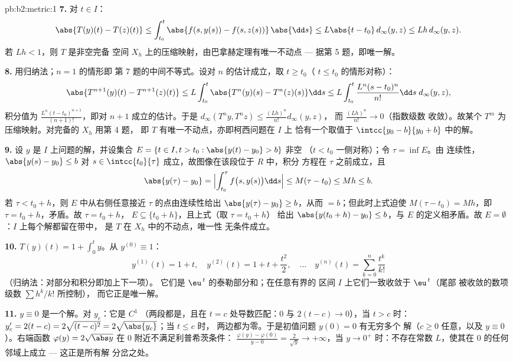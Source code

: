 \begin{solution}{pb:b2:metric:1}
\textbf{7.} 对 $t \in I$：
\[
\abs{T(y)(t) - T(z)(t)} \leq \int_{t_0}^{t}\abs{f(s, y(s)) -
f(s, z(s))}\,\abs{\dd s} \leq L\abs{t - t_0}\,d_\infty(y,z)
\leq Lh\,d_\infty(y,z).
\]
若 $Lh < 1$，则 $T$ 是非空完备
空间 $X_h$ 上的压缩映射，由巴拿赫定理有唯一不动点 ---
据第 5 题，即唯一解。

\textbf{8.} 用归纳法；$n = 1$ 的情形即
第 7 题的中间不等式。设对 $n$ 的估计成立，取 $t \geq t_0$（
$t \leq t_0$ 的情形对称）：
\[
\abs{T^{n+1}(y)(t) - T^{n+1}(z)(t)}
\leq L\int_{t_0}^{t}\abs{T^n(y)(s) - T^n(z)(s)}\dd s
\leq L\int_{t_0}^{t}\frac{L^n(s - t_0)^n}{n!}\dd s\;
d_\infty(y,z),
\]
积分值为 $\frac{L^n(t -
t_0)^{n+1}}{(n+1)!}$，即对 $n + 1$ 成立的估计。于是
$d_\infty(T^n y, T^n z) \leq \frac{(Lh)^n}{n!}d_\infty(y, z)$，
而 $\frac{(Lh)^n}{n!} \to 0$（指数级数
收敛）。故某个 $T^m$ 为压缩映射。对完备的 $X_h$ 用第 4 题，
即 $T$ 有唯一不动点，亦即柯西问题在 $I$ 上
恰有一个取值于
$\intcc{y_0 - b}{y_0 + b}$ 中的解。

\textbf{9.} 设 $y$ 是 $I$ 上问题的解，并设集合
$E = \{t \in I, t > t_0 : \abs{y(t) - y_0} > b\}$ 非空
（$t < t_0$ 一侧对称）；令 $\tau = \inf E$。由
连续性，$\abs{y(s) - y_0} \leq b$ 对 $s \in
\intcc{t_0}{\tau}$ 成立，故图像在该段位于 $R$ 中，积分
方程在 $\tau$ 之前成立，且
\[
\abs{y(\tau) - y_0} = \Bigl|\int_{t_0}^{\tau}f\bigl(s,
y(s)\bigr)\dd s\Bigr| \leq M(\tau - t_0) \leq Mh \leq b .
\]
若 $\tau < t_0 + h$，则 $E$ 中从右侧任意接近 $\tau$
的点由连续性给出 $\abs{y(\tau) - y_0} \geq
b$，从而 $= b$；但此时上式迫使 $M(\tau - t_0) =
Mh$，即 $\tau = t_0 + h$，矛盾。故 $\tau = t_0 + h$，
$E \subseteq \{t_0 + h\}$，且上式（取 $\tau = t_0 + h$）
给出 $\abs{y(t_0 + h) - y_0} \leq b$，与
$E$ 的定义相矛盾。故 $E = \emptyset$：$I$ 上每个解都留在带中，
是 $T$ 在 $X_h$ 中的不动点，唯一性
无条件成立。

\textbf{10.} $T(y)(t) = 1 + \int_0^t y$。从 $y^{(0)} \equiv
1$：
\[
y^{(1)}(t) = 1 + t,\quad
y^{(2)}(t) = 1 + t + \frac{t^2}2,\quad\dots\quad
y^{(n)}(t) = \sum_{k=0}^{n}\frac{t^k}{k!}
\]
（归纳法：对部分和积分即加上下一项）。
它们是 $\eu^{\,t}$ 的泰勒部分和；在任意有界的
区间 $I$ 上它们一致收敛于 $\eu^{\,t}$（尾部
被收敛的数项级数 $\sum h^k/k!$ 所控制），
而它正是唯一解。

\textbf{11.} $y \equiv 0$ 是一个解。对 $y_c$：它是 $C^1$
（两段都是，且在 $t = c$ 处导数匹配：$0$ 与
$2(t - c) \to 0$），当 $t > c$ 时：$y_c' = 2(t - c) =
2\sqrt{(t-c)^2} = 2\sqrt{\abs{y_c}}$；当 $t \leq c$ 时，
两边都为零。于是初值问题 $y(0) = 0$ 有无穷多个
解（$c \geq 0$ 任意，以及 $y \equiv 0$）。右端函数
$\varphi(y) = 2\sqrt{\abs y}$ 在 $0$ 附近不满足利普希茨条件：
$\frac{\varphi(y) - \varphi(0)}{y - 0} = \frac{2}{\sqrt y} \to
+\infty$，当 $y \to 0^+$ 时：不存在常数 $L$，使其在
$0$ 的任何邻域上成立 --- 这正是所有解
分岔之处。


\end{solution}
